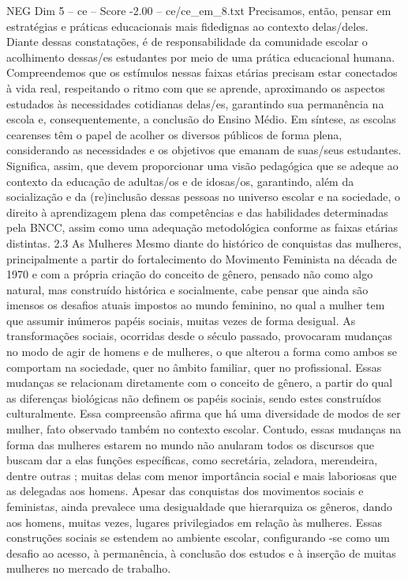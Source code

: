 \begin{textsample}{NEG Dim 5 – ce – Score -2.00 – ce/ce\_em\_8.txt}
Precisamos, então, pensar em estratégias e práticas educacionais mais fidedignas ao contexto delas/deles.
Diante dessas constatações, é de responsabilidade da comunidade escolar o acolhimento dessas/es estudantes por meio de uma prática educacional humana.
Compreendemos que os estímulos nessas faixas etárias precisam estar conectados à vida real, respeitando o ritmo com que se aprende, aproximando os aspectos estudados às necessidades cotidianas delas/es, garantindo sua permanência na escola e, consequentemente, a conclusão do Ensino Médio.
Em síntese, as escolas cearenses têm o papel de acolher os diversos públicos de forma plena, considerando as necessidades e os objetivos que emanam de suas/seus estudantes.
Significa, assim, que devem proporcionar uma visão pedagógica que se adeque ao contexto da educação de adultas/os e de idosas/os, garantindo, além da socialização e da (re)inclusão dessas pessoas no universo escolar e na sociedade, o direito à aprendizagem plena das competências e das habilidades determinadas pela BNCC, assim como uma adequação metodológica conforme as faixas etárias distintas. 2.3 As Mulheres Mesmo diante do histórico de conquistas das mulheres, principalmente a partir do fortalecimento do Movimento Feminista na década de 1970 e com a própria criação do conceito de gênero, pensado não como algo natural, mas construído histórica e socialmente, cabe pensar que ainda são imensos os desafios atuais impostos ao mundo feminino, no qual a mulher tem que assumir inúmeros papéis sociais, muitas vezes de forma desigual.
As transformações sociais, ocorridas desde o século passado, provocaram mudanças no modo de agir de homens e de mulheres, o que alterou a forma como ambos se comportam na sociedade, quer no âmbito familiar, quer no profissional.
Essas mudanças se relacionam diretamente com o conceito de gênero, a partir do qual as diferenças biológicas não definem os papéis sociais, sendo estes construídos culturalmente.
Essa compreensão afirma que há uma diversidade de modos de ser mulher, fato observado também no contexto escolar.
Contudo, essas mudanças na forma das mulheres estarem no mundo não anularam todos os discursos que buscam dar a elas funções específicas, como secretária, zeladora, merendeira, dentre outras ; muitas delas com menor importância social e mais laboriosas que as delegadas aos homens.
Apesar das conquistas dos movimentos sociais e feministas, ainda prevalece uma desigualdade que hierarquiza os gêneros, dando aos homens, muitas vezes, lugares privilegiados em relação às mulheres.
Essas construções sociais se estendem ao ambiente escolar, configurando -se como um desafio ao acesso, à permanência, à conclusão dos estudos e à inserção de muitas mulheres no mercado de trabalho.

\end{textsample}
